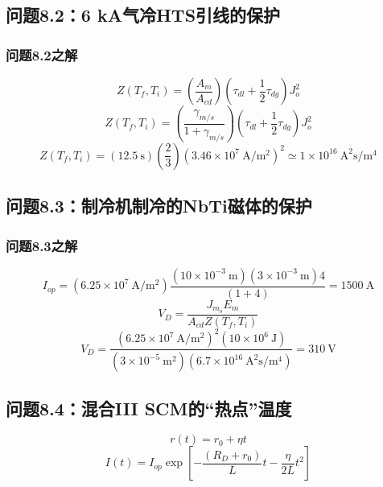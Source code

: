 \subsection{问题8.2：6 kA气冷HTS引线的保护}


\subsubsection{问题8.2之解}
\begin{equation}%
Z(T_f,T_i)=\left(\frac{A_m}{A_{cd}}\right)(\tau_{dl}+\frac{1}{2}\tau_{dg})J_{o}^{2}
\end{equation}
\begin{equation}%
Z(T_f,T_i)=\left(\frac{\gamma_{m/s}}{1+\gamma_{m/s}}\right)(\tau_{dl}+\frac{1}{2}\tau_{dg})J_{o}^{2}
\end{equation}
\begin{equation}%
Z(T_f,T_i)=(12.5\ \mathrm{s})\left(\frac{2}{3}\right)(3.46\times 10^7\ \mathrm{A/m^2})^2\simeq 1\times 10^{16}\ \mathrm{A^2s/m^4}
\end{equation}



\subsection{问题8.3：制冷机制冷的NbTi磁体的保护}

\subsubsection{问题8.3之解}
\begin{equation}%
I_{op}=(6.25\times 10^7\ \mathrm{A/m^2})\frac{(10\times 10^{-3}\ \mathrm{m})(3\times 10^{-3}\ \mathrm{m})4}{(1+4)}=1500\ \mathrm{A}
\end{equation}
\begin{equation}%
V_D=\frac{J_{m_o}E_m}{A_{cd}Z(T_f,T_i)}
\end{equation}
\begin{equation}%
V_D=\frac{(6.25\times 10^7\ \mathrm{A/m^2})^2(10\times 10^6\ \mathrm{J})}{(3\times 10^{-5}\ \mathrm{m^2})(6.7\times 10^{16}\ \mathrm{A^2s/m^4})} 
=310\ \mathrm{V}
\end{equation}



\subsection{问题8.4：混合III SCM的“热点”温度}
\begin{equation}%
r(t)=r_0+\eta t
\end{equation}
\begin{equation}%
I(t)=I_{op}\exp\left[-\frac{(R_D+r_0)}{L}t-\frac{\eta}{2L}t^2\right]
\end{equation}


